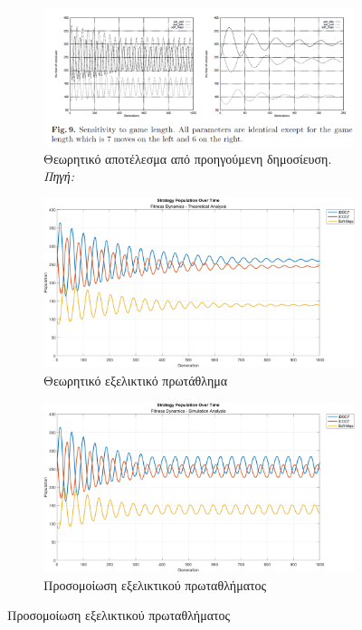 \documentclass[12pt]{report}
\begin{document}
\begin{figure}[htbp]
    \centering

    \begin{subfigure}[b]{0.5\linewidth}
        \centering
        \includegraphics[width=\linewidth]{Figures Fitness Dynamics/9.png}
        \caption{Θεωρητικό αποτέλεσμα από προηγούμενη δημοσίευση. \textit{Πηγή:} \protect\cite{mathieu1999}}
        \label{fig:fig_fit_9_a}
    \end{subfigure}
    \hfill
    \begin{subfigure}[b]{0.5\linewidth}
        \centering
        \includegraphics[width=\linewidth]{Figures Fitness Dynamics/example9a.png}
        \caption{Θεωρητικό εξελικτικό πρωτάθλημα}
        \label{fig:fig_fit_9a_b}
    \end{subfigure}
    \hfill
    \begin{subfigure}[b]{0.5\linewidth}
        \centering
        \includegraphics[width=\linewidth]{Figures Fitness Dynamics/example9a-sim.png}
        \caption{Προσομοίωση εξελικτικού πρωταθλήματος}
        \label{fig:fig_fit_9a_c}
        

\end{subfigure}
\end{figure}
\end{document}
